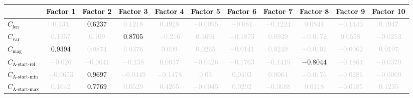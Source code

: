 \documentclass{standalone}
\newcommand{\magnitudename}{\text{mag}}
\newcommand{\magnitude}{C_{\magnitudename}}
\newcommand{\varietyname}{\text{var}}
\newcommand{\variety}{C_{\varietyname}}
\newcommand{\lengthname}{\text{len}}
\newcommand{\length}{C_{\lengthname}}
\newcommand{\startactivitiesrelname}{\text{A-start-rel}}
\newcommand{\startactivitiesrel}{C_{\startactivitiesrelname}}
\newcommand{\startminname}{\text{A-start-min}}
\newcommand{\startmin}{C_{\startminname}}
\newcommand{\startmaxname}{\text{A-start-max}}
\newcommand{\startmax}{C_{\startmaxname}}
\begin{document}
\begin{tabular}{lcccccccccc} \toprule 
 & \textbf{Factor 1} & \textbf{Factor 2} & \textbf{Factor 3} & \textbf{Factor 4} & \textbf{Factor 5} & \textbf{Factor 6} & \textbf{Factor 7} & \textbf{Factor 8} & \textbf{Factor 9} & \textbf{Factor 10} \\ \midrule 
$\length$ & \textcolor{lightgray}{$0.134$} & $0.6237$ & \textcolor{lightgray}{$0.1218$} & \textcolor{lightgray}{$0.4928$} & \textcolor{lightgray}{$-0.0095$} & \textcolor{lightgray}{$-0.081$} & \textcolor{lightgray}{$-0.1224$} & \textcolor{lightgray}{$0.0841$} & \textcolor{lightgray}{$-0.1443$} & \textcolor{lightgray}{$0.1947$} \\ 
$\variety$ & \textcolor{lightgray}{$0.1257$} & \textcolor{lightgray}{$0.109$} & $0.8705$ & \textcolor{lightgray}{$-0.216$} & \textcolor{lightgray}{$0.1091$} & \textcolor{lightgray}{$-0.1873$} & \textcolor{lightgray}{$0.0939$} & \textcolor{lightgray}{$-0.0172$} & \textcolor{lightgray}{$0.0558$} & \textcolor{lightgray}{$-0.0253$} \\ 
$\magnitude$ & $0.9394$ & \textcolor{lightgray}{$0.0874$} & \textcolor{lightgray}{$0.0376$} & \textcolor{lightgray}{$0.009$} & \textcolor{lightgray}{$0.0265$} & \textcolor{lightgray}{$-0.0141$} & \textcolor{lightgray}{$0.0249$} & \textcolor{lightgray}{$-0.0102$} & \textcolor{lightgray}{$-0.0062$} & \textcolor{lightgray}{$0.0197$} \\ 
$\startactivitiesrel$ & \textcolor{lightgray}{$-0.026$} & \textcolor{lightgray}{$-0.0641$} & \textcolor{lightgray}{$-0.138$} & \textcolor{lightgray}{$0.0037$} & \textcolor{lightgray}{$-0.0426$} & \textcolor{lightgray}{$-0.1763$} & \textcolor{lightgray}{$-0.1419$} & $-0.8044$ & \textcolor{lightgray}{$-0.1864$} & \textcolor{lightgray}{$-0.0379$} \\ 
$\startmin$ & \textcolor{lightgray}{$-0.0673$} & $0.9697$ & \textcolor{lightgray}{$-0.0449$} & \textcolor{lightgray}{$-0.1478$} & \textcolor{lightgray}{$0.03$} & \textcolor{lightgray}{$0.0403$} & \textcolor{lightgray}{$0.0064$} & \textcolor{lightgray}{$-0.0176$} & \textcolor{lightgray}{$-0.0286$} & \textcolor{lightgray}{$-0.0009$} \\ 
$\startmax$ & \textcolor{lightgray}{$0.1042$} & $0.7769$ & \textcolor{lightgray}{$0.0529$} & \textcolor{lightgray}{$0.4265$} & \textcolor{lightgray}{$-0.0045$} & \textcolor{lightgray}{$0.0292$} & \textcolor{lightgray}{$-0.0088$} & \textcolor{lightgray}{$0.0118$} & \textcolor{lightgray}{$-0.0185$} & \textcolor{lightgray}{$0.1235$} \\ 

\end{tabular}
\end{document}
